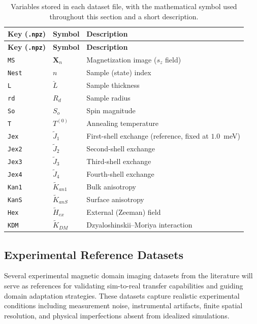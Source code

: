 \documentclass[letterpaper, 12, one column]{article}
\begin{document}
\begin{longtable}{lll}
\caption{Variables stored in each dataset file, with the mathematical symbol used throughout this section and a short description.} \label{tab:variables} \\
\hline
\textbf{Key (\texttt{.npz})} & \textbf{Symbol} & \textbf{Description} \\
\hline
\endfirsthead
\hline
\textbf{Key (\texttt{.npz})} & \textbf{Symbol} & \textbf{Description} \\
\hline
\endhead
\texttt{MS}   & $\mathbf{X}_n$    & Magnetization image ($s_z$ field) \\
\texttt{Nest} & $n$               & Sample (state) index \\
\texttt{L}    & $\breve{L}$       & Sample thickness \\
\texttt{rd}   & $R_d$             & Sample radius \\
\texttt{So}   & $S_o$             & Spin magnitude \\
\texttt{T}    & $T^{(0)}$         & Annealing temperature \\
\texttt{Jex}  & $\tilde{J}_1$     & First-shell exchange (reference, fixed at $1.0$~meV) \\
\texttt{Jex2} & $\tilde{J}_2$     & Second-shell exchange \\
\texttt{Jex3} & $\tilde{J}_3$     & Third-shell exchange \\
\texttt{Jex4} & $\tilde{J}_4$     & Fourth-shell exchange \\
\texttt{Kan1} & $\tilde{K}_{an1}$ & Bulk anisotropy \\
\texttt{KanS} & $\tilde{K}_{anS}$ & Surface anisotropy \\
\texttt{Hex}  & $\tilde{H}_{ex}$  & External (Zeeman) field \\
\texttt{KDM}  & $\tilde{K}_{DM}$  & Dzyaloshinskii--Moriya interaction \\
\hline
\end{longtable}

\subsection{Experimental Reference Datasets}\label{sec:experimental_datasets}

Several experimental magnetic domain imaging datasets from the literature will serve as references for validating sim-to-real transfer capabilities and guiding domain adaptation strategies. These datasets capture realistic experimental conditions including measurement noise, instrumental artifacts, finite spatial resolution, and physical imperfections absent from idealized simulations.
\end{document}
